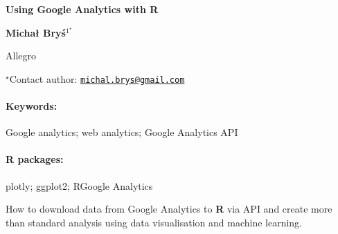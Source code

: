 \documentclass[11pt, a4paper]{article}
\renewcommand{\title}[1]{\begin{center}{\bf \LARGE #1}\end{center}}
\newcommand{\keywords}{\paragraph{Keywords:}}
\newcommand{\packages}{\paragraph{R packages:}}
\begin{document}
\pagestyle{empty}

\title{Using Google Analytics with R}

\begin{center}
  {\bf Michał Bryś$^{1^\star}$}
\end{center}

\vskip 0.3cm

\begin{affiliations}
\begin{enumerate}
\begin{minipage}{0.915\textwidth}
\centering
\item Allegro \\[-2pt]
\end{minipage}
\end{enumerate}
$^\star$Contact author: \href{mailto:michal.brys@gmail.com}{\nolinkurl{michal.brys@gmail.com}}\\
\end{affiliations}

\vskip 0.5cm

\begin{minipage}{0.915\textwidth}
\keywords Google analytics; web analytics; Google Analytics API
\packages plotly; ggplot2; RGoogle Analytics
\end{minipage}

\vskip 0.8cm

How to download data from Google Analytics to \textbf{R} via API and
create more than standard analysis using data visualisation and machine
learning.
\end{document}
